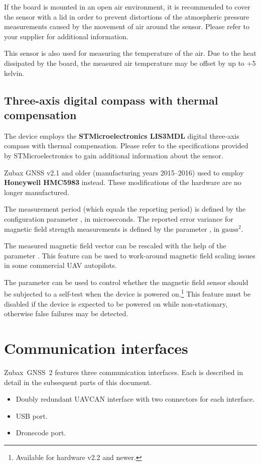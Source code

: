\documentclass{zubaxdoc}
\begin{document}
If the board is mounted in an open air environment, it is recommended to cover the sensor with a lid
in order to prevent distortions of the atmospheric pressure measurements caused by the movement of air
around the sensor.
Please refer to your supplier for additional information.

This sensor is also used for measuring the temperature of the air.
Due to the heat dissipated by the board,
the measured air temperature may be offset by up to +5 kelvin.

\subsection{Three-axis digital compass with thermal compensation}

The device employs the \textbf{STMicroelectronics LIS3MDL} digital three-axis compass with thermal compensation.
Please refer to the specifications provided by STMicroelectronics to gain additional information about the sensor.

Zubax GNSS v2.1 and older (manufacturing years 2015--2016) used to employ \textbf{Honeywell HMC5983} instead.
These modifications of the hardware are no longer manufactured.

The measurement period (which equals the reporting period) is defined by the configuration parameter 
, in microseconds.
The reported error variance for magnetic field strength measurements is defined by the parameter
, in $\text{gauss}^2$.

The measured magnetic field vector can be rescaled with the help of the parameter .
This feature can be used to work-around magnetic field scaling issues in some commercial UAV autopilots.

The parameter  can be used to control whether the magnetic field sensor should be
subjected to a self-test when the device is powered on.\footnote{Available for hardware v2.2 and newer.}
This feature must be disabled if the device is expected to be powered on while non-stationary,
otherwise false failures may be detected.

\section{Communication interfaces}

Zubax~GNSS~2 features three communication interfaces. Each is described in detail in the subsequent parts of this document.
\begin {itemize}
\item Doubly redundant UAVCAN interface with two connectors for each interface.
\item USB port.
\item Dronecode port.
\end{itemize}
\end{document}
